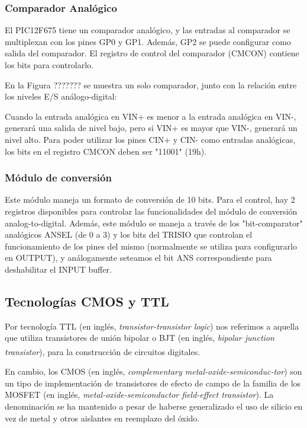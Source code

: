 \documentclass[a4paper]{article}
\let\originalcite\cite
\renewcommand{\cite}[2][]{\textsuperscript{\originalcite{#2}}}
\begin{document}
\subsubsection*{Comparador Analógico}

El PIC12F675 tiene un comparador analógico, y las entradas al
comparador se multiplexan con los pines GP0 y GP1.
Además, GP2 se puede configurar como salida del comparador.
El registro de control del comparador (CMCON) contiene
los bits para controlarlo.
	
En la Figura ??????? se muestra un solo comparador, junto con
la relación entre los niveles E/S análogo-digital:
		
Cuando la entrada analógica en VIN+ es menor a la entrada
analógica en VIN-, generará una salida de nivel bajo, pero si VIN+
es mayor que VIN-, generará un nivel alto.
Para poder utilizar los pines CIN+ y CIN- como entradas analógicas,
los bits en el registro CMCON deben ser "11001" (19h).
		
\subsubsection*{Módulo de conversión}

Este módulo maneja un formato de conversión de 10 bits. Para el control,
hay 2 registros disponibles para controlar las funcionalidades
del módulo de conversión analog-to-digital.
Además, este módulo se maneja a través de los "bit-comparator" analógicos
ANSEL (de 0 a 3) y los bits del TRISIO que controlan el funcionamiento
de los pines del mismo (normalmente se utiliza para configurarlo en OUTPUT),
y análogamente seteamos el bit ANS correspondiente para deshabilitar el INPUT buffer.
	
\subsection*{Tecnologías CMOS y TTL}

Por tecnología TTL (en inglés, \textit{transistor-transistor logic})
nos referimos a aquella que utiliza transistores de unión bipolar o 
BJT (en inglés, \textit{bipolar junction transistor}), para la 
construcción de circuitos digitales\cite{bib:boylestad}.

En cambio, los CMOS (en inglés, \textit{complementary 
metal-oxide-semiconduc-tor}) son un tipo de implementación de 
transistores de efecto de campo de la familia de los MOSFET (en 
inglés, \textit{metal-oxide-semiconductor field-effect transistor}). 
La denominación se ha mantenido a pesar de haberse generalizado el 
uso de silicio en vez de metal y otros aislantes en reemplazo del 
óxido.
\end{document}
